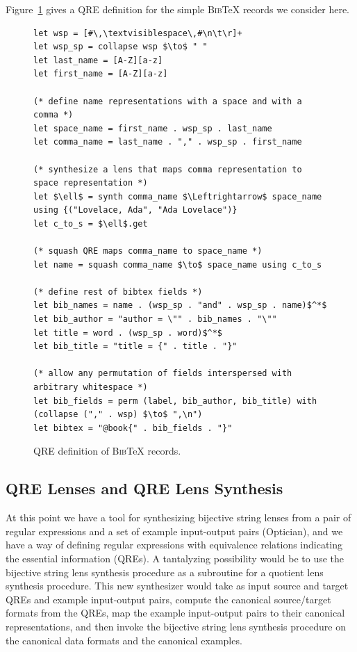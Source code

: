 \documentclass[acmsmall,review,anonymous]{acmart}
\newcommand{\bibtex}{\textsc{Bib}\TeX{}}
\begin{document}
Figure~\ref{fig:example-qre} gives a QRE definition for the simple
\bibtex{} records we consider here.
\begin{figure}
\begin{lstlisting}
let wsp = [#\,\textvisiblespace\,#\n\t\r]+
let wsp_sp = collapse wsp $\to$ " "
let last_name = [A-Z][a-z]
let first_name = [A-Z][a-z]

(* define name representations with a space and with a comma *)
let space_name = first_name . wsp_sp . last_name
let comma_name = last_name . "," . wsp_sp . first_name

(* synthesize a lens that maps comma representation to space representation *)
let $\ell$ = synth comma_name $\Leftrightarrow$ space_name using {("Lovelace, Ada", "Ada Lovelace")}
let c_to_s = $\ell$.get

(* squash QRE maps comma_name to space_name *)
let name = squash comma_name $\to$ space_name using c_to_s

(* define rest of bibtex fields *)
let bib_names = name . (wsp_sp . "and" . wsp_sp . name)$^*$
let bib_author = "author = \"" . bib_names . "\""
let title = word . (wsp_sp . word)$^*$
let bib_title = "title = {" . title . "}"

(* allow any permutation of fields interspersed with arbitrary whitespace *)
let bib_fields = perm (label, bib_author, bib_title) with (collapse ("," . wsp) $\to$ ",\n")
let bibtex = "@book{" . bib_fields . "}"
\end{lstlisting}
\caption{QRE definition of \bibtex{} records.}
\label{fig:example-qre}
\end{figure}


\subsection{QRE Lenses and QRE Lens Synthesis}
\label{sec:examplesynth}
At this point we have a tool for synthesizing bijective string lenses from a
pair of regular expressions and a set of example input-output pairs
(Optician), 
and we have a way of defining regular expressions with equivalence
relations indicating the essential information (QREs).
A tantalyzing possibility would be to use the bijective string lens
synthesis procedure as a subroutine for a quotient lens synthesis procedure. 
This new synthesizer would take as input source and target QREs and 
example input-output pairs, 
compute the canonical source/target formats from the QREs, 
map the example input-output pairs to their canonical representations,
and then invoke the bijective string lens synthesis procedure on the canonical data
formats and the canonical examples.
\end{document}
